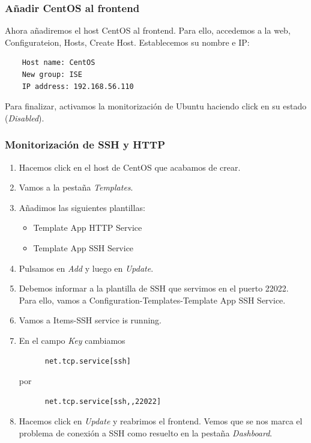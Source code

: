 \documentclass[12pt,spanish]{article}
\begin{document}
\subsubsection{Añadir CentOS al frontend}

Ahora añadiremos el host CentOS al frontend. Para ello, accedemos a la web, Configurateion, Hosts, Create Host. Establecemos su nombre e IP:
\begin{lstlisting}
    Host name: CentOS
    New group: ISE
    IP address: 192.168.56.110
\end{lstlisting}

Para finalizar, activamos la monitorización de Ubuntu haciendo click en su estado (\textit{Disabled}).

\subsubsection{Monitorización de SSH y HTTP}

\begin{enumerate}
  \item Hacemos click en el host de CentOS que acabamos de crear.
  \item Vamos a la pestaña \textit{Templates}.
  \item Añadimos las siguientes plantillas:
  \begin{itemize}
    \item Template App HTTP Service
    \item Template App SSH Service
  \end{itemize}
  \item Pulsamos en \textit{Add} y luego en \textit{Update}.
  \item Debemos informar a la plantilla de SSH que servimos en el puerto 22022. Para ello, vamos a Configuration-Templates-Template App SSH Service.
  \item Vamos a Items-SSH service is running.
  \item En el campo \textit{Key} cambiamos
  \begin{lstlisting}
      net.tcp.service[ssh]
  \end{lstlisting}
  por
  \begin{lstlisting}
      net.tcp.service[ssh,,22022]
  \end{lstlisting}
  \item Hacemos click en \textit{Update} y reabrimos el frontend. Vemos que se nos marca el problema de conexión a SSH como resuelto en la pestaña \textit{Dashboard}.
\end{enumerate}
\end{document}
